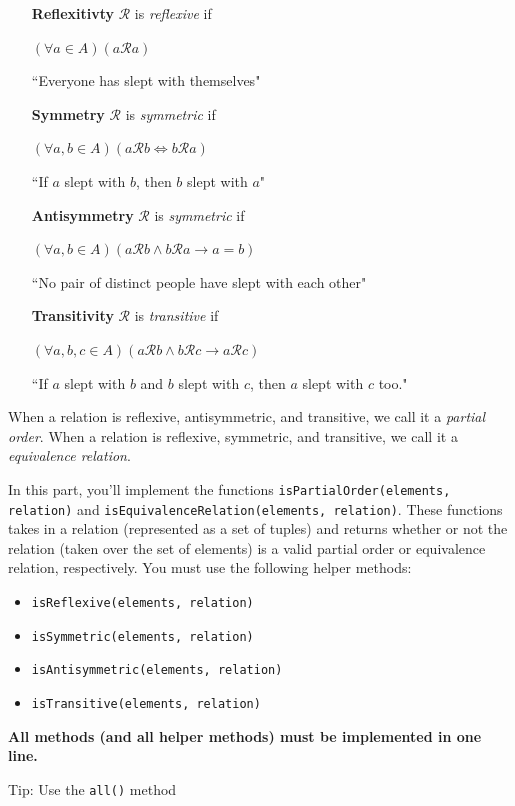 \documentclass{article}
\begin{document}
    \begin{enumerate}[align=left]
        \item [\textbf{Reflexitivty}] $\mathcal{R}$ is \textit{reflexive} if 

        $(\forall a \in A)(a\mathcal{R}a)$

        ``Everyone has slept with themselves"
        \item [\textbf{Symmetry}] $\mathcal{R}$ is \textit{symmetric} if 

        $(\forall a, b \in A)(a\mathcal{R}b \iff b\mathcal{R}a)$

        ``If $a$ slept with $b$, then $b$ slept with $a$"

        \item [\textbf{Antisymmetry}] $\mathcal{R}$ is \textit{symmetric} if 

        $(\forall a, b\in A)(a\mathcal{R}b \wedge b\mathcal{R}a \rightarrow a=b)$

        ``No pair of distinct people have slept with each other"

        \item [\textbf{Transitivity}] $\mathcal{R}$ is \textit{transitive} if 

        $(\forall a, b, c\in A)(a\mathcal{R}b \wedge b\mathcal{R}c \rightarrow a\mathcal{R}c)$

        ``If $a$ slept with $b$ and $b$ slept with $c$, then $a$ slept with $c$ too."
    \end{enumerate}

    When a relation is reflexive, antisymmetric, and transitive, we call it a \textit{partial order}. When a relation is reflexive, symmetric, and transitive, we call it a \textit{equivalence relation}.

    \vspace{3mm}
    \begin{tcolorbox}[colback=yellow!30]
        In this part, you'll implement the functions \lstinline{isPartialOrder(elements, relation)} and \lstinline{isEquivalenceRelation(elements, relation)}. These functions takes in a relation (represented as a set of tuples) and returns whether or not the relation (taken over the set of elements) is a valid partial order or equivalence relation, respectively. You must use the following helper methods:
        \begin{itemize}
            \item \lstinline{isReflexive(elements, relation)}
            \item \lstinline{isSymmetric(elements, relation)}
            \item \lstinline{isAntisymmetric(elements, relation)}
            \item \lstinline{isTransitive(elements, relation)}
        \end{itemize}
        \textbf{All methods (and all helper methods) must be implemented in one line.}
        
        Tip: Use the \lstinline{all()} method
    \end{tcolorbox}
\end{document}
